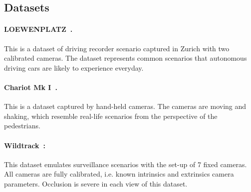 \documentclass[runningheads]{llncs}
\begin{document}
\subsection{Datasets}

\paragraph{\bf{LOEWENPLATZ}~\cite{Authors48}.} This is a dataset of driving recorder scenario captured in Zurich with two calibrated cameras. The dataset represents common scenarios that autonomous driving cars are likely to experience everyday. \paragraph{\bf{Chariot Mk I}~\cite{Authors43}.} This is a dataset captured by hand-held cameras. The cameras are moving and shaking, which resemble real-life scenarios from the perspective of the pedestrians.
\paragraph{\bf{Wildtrack}~\cite{Authors44}:} This dataset emulates surveillance scenarios with the set-up of 7 fixed cameras.
All cameras are fully calibrated, i.e. known intrinsics and extrinsics camera parameters. Occlusion is severe in each view of this dataset.
\end{document}
